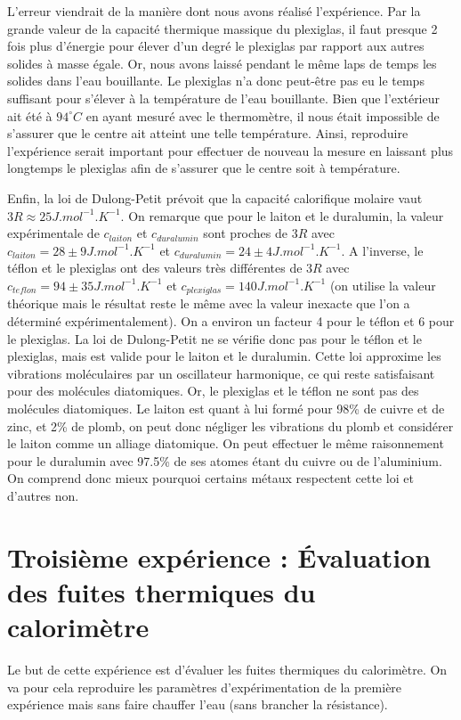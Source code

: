 \documentclass[12pt]{article}
\begin{document}
L'erreur viendrait de la manière dont nous avons réalisé l'expérience. Par la grande valeur de la capacité thermique massique du plexiglas, il faut presque 2 fois plus d'énergie pour élever d'un degré le plexiglas
par rapport aux autres solides à masse égale. Or, nous avons laissé pendant le même laps de temps les solides dans l'eau bouillante. Le plexiglas n'a donc peut-être pas eu le temps suffisant pour s'élever à la température de l'eau bouillante.
Bien que l'extérieur ait été à $94^\circ C$ en ayant mesuré avec le thermomètre, il nous était impossible de s'assurer que le centre ait atteint une telle température. Ainsi, reproduire l'expérience serait important pour effectuer de nouveau la mesure
en laissant plus longtemps le plexiglas afin de s'assurer que le centre soit à température.


Enfin, la loi de Dulong-Petit prévoit que la capacité calorifique molaire vaut $3R \approx 25 J.mol^{-1}.K^{-1}$. On remarque que pour le laiton et le duralumin, 
la valeur expérimentale de $c_{laiton}$ et $c_{duralumin}$ sont proches de $3R$ avec $c_{laiton} = 28 \pm 9 J.mol^{-1}.K^{-1}$ et $c_{duralumin} = 24 \pm 4 J.mol^{-1}.K^{-1}$. 
A l'inverse, le téflon et le plexiglas ont des valeurs très différentes de $3R$ avec $c_{teflon} = 94 \pm 35 J.mol^{-1}.K^{-1}$ et $c_{plexiglas} = 140 J.mol^{-1}.K^{-1}$ 
(on utilise la valeur théorique mais le résultat reste le même avec la valeur inexacte que l'on a déterminé expérimentalement). On a environ un facteur 4 pour le téflon et 6 pour le plexiglas. La loi de Dulong-Petit ne se vérifie donc pas pour le téflon et le plexiglas, mais est valide pour le laiton et le duralumin.
Cette loi approxime les vibrations moléculaires par un oscillateur harmonique, ce qui reste satisfaisant pour des molécules diatomiques. Or, le plexiglas et le téflon ne sont pas des molécules diatomiques. 
Le laiton est quant à lui formé pour 98\% de cuivre et de zinc, et 2\% de plomb, on peut donc négliger les vibrations du plomb et considérer le laiton comme un alliage diatomique. On peut effectuer le même raisonnement pour le duralumin avec 97.5\% de ses atomes
étant du cuivre ou de l'aluminium. On comprend donc mieux pourquoi certains métaux respectent cette loi et d'autres non.


\newpage
\section{Troisième expérience : Évaluation des fuites thermiques du calorimètre}
Le but de cette expérience est d'évaluer les fuites thermiques du calorimètre. On va pour cela reproduire les paramètres d'expérimentation de la première expérience mais sans faire chauffer l'eau (sans brancher la résistance).
\end{document}
